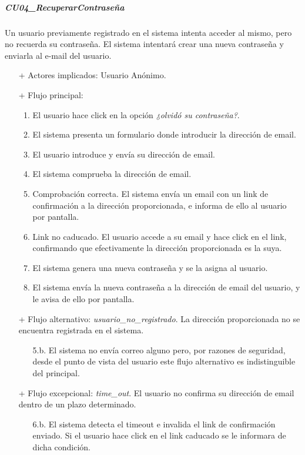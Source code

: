 \documentclass[a4paper]{article}
\begin{document}
            \subparagraph{CU04\_RecuperarContraseña}
                Un usuario previamente registrado en el sistema intenta acceder al mismo, pero no recuerda su contraseña. El sistema intentará crear una nueva contraseña y enviarla al e-mail del usuario.
                \begin{itemize}
                    \item[+] Actores implicados: Usuario Anónimo.
                    \item[+] Flujo principal:
                    \begin{enumerate}
                        \item El usuario hace click en la opción \emph{¿olvidó su contraseña?}.
                        \item El sistema presenta un formulario donde introducir la dirección de email.
                        \item El usuario introduce y envía su dirección de email.
                        \item El sistema comprueba la dirección de email.
                        \item Comprobación correcta. El sistema envía un email con un link de confirmación a la dirección proporcionada, e informa de ello al usuario por pantalla.
                        \item Link no caducado. El usuario accede a su email y hace click en el link, confirmando que efectivamente la dirección proporcionada es la suya.
                        \item El sistema genera una nueva contraseña y se la asigna al usuario.
                        \item El sistema envía la nueva contraseña a la dirección de email del usuario, y le avisa de ello por pantalla.
                    \end{enumerate}
                    \item[+] Flujo alternativo: \emph{usuario\_no\_registrado}. La dirección proporcionada no se encuentra registrada en el sistema.
                    \begin{itemize}
                        \item[5.b.] El sistema no envía correo alguno pero, por razones de seguridad, desde el punto de vista del usuario este flujo alternativo es indistinguible del principal.
                    \end{itemize}
                    \item[+] Flujo excepcional: \emph{time\_out}. El usuario no confirma su dirección de email dentro de un plazo determinado.
                    \begin{itemize}
                        \item[6.b.] El sistema detecta el timeout e invalida el link de confirmación enviado. Si el usuario hace click en el link caducado se le informara de dicha condición.
                    \end{itemize}
                \end{itemize}
\end{document}

